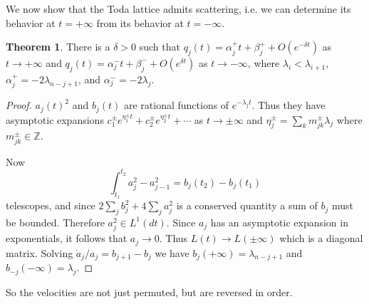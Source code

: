 \documentclass[12pt]{report}
\newcommand{\ZZ}{\mathbb{Z}}
\theoremstyle{definition}
\newtheorem{theorem}{Theorem}[chapter]
\begin{document}
We now show that the Toda lattice admits scattering, i.e. we can determine its behavior at $t = +\infty$ from its behavior at $t = -\infty$.
\begin{theorem}
There is a $\delta > 0$ such that $q_j(t) = \alpha_j^+t + \beta_j^+ + O(e^{-\delta t})$ as $t \to +\infty$ and $q_j(t) = \alpha_j^-t + \beta_j^- + O(e^{\delta t})$ as $t \to -\infty$, where
$\lambda_i < \lambda_{i+1}$, $\alpha_j^+ = -2\lambda_{n-j+1}$, and $\alpha_j^- = -2\lambda_j$.
\end{theorem}
\begin{proof}
$a_j(t)^2$ and $b_j(t)$ are rational functions of $e^{-\lambda_jt}$. Thus they have asymptotic expansions $c_1^\pm e^{\eta_1^\pm t}+c_2^\pm e^{\eta_2^\pm t} + \cdots$ as $t \to \pm \infty$ and $\eta_j^\pm = \sum_k m_{jk}^\pm \lambda_j$ where $m_{jk}^\pm \in \ZZ$.

Now
$$\int_{t_1}^{t_2}a_j^2 - a_{j-1}^2 = b_j(t_2) - b_j(t_1)$$
telescopes, and since $2\sum_j b_j^2 + 4\sum_j a_j^2$ is a conserved quantity a sum of $b_j$ must be bounded. Therefore $a_j^2 \in L^1(dt)$.
Since $a_j$ has an asymptotic expansion in exponentials, it follows that $a_j \to 0$. Thus $L(t) \to L(\pm \infty)$ which is a diagonal matrix.
Solving $\dot a_j/a_j = b_{j+1} - b_j$ we have $b_j(+\infty) = \lambda_{n-j+1}$ and $b_{-j}(-\infty) = \lambda_j$.
\end{proof}
So the velocities are not just permuted, but are reversed in order.
\end{document}
